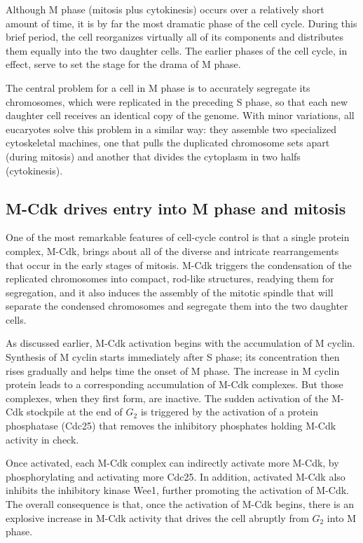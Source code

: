 Although M phase (mitosis plus cytokinesis) occurs over a relatively short
amount of time, it is by far the most dramatic phase of the
cell cycle. During this brief period, the cell reorganizes virtually all of its
components and distributes them equally into the two daughter cells.
The earlier phases of the cell cycle, in effect, serve to set the stage for the
drama of M phase.

The central problem for a cell in M phase is to accurately segregate its
chromosomes, which were replicated in the preceding S phase, so that
each new daughter cell receives an identical copy of the genome. With
minor variations, all eucaryotes solve this problem in a similar way: they
assemble two specialized cytoskeletal machines, one that pulls the duplicated
chromosome sets apart (during mitosis) and another that divides
the cytoplasm in two halfs (cytokinesis).

\subsection{M-Cdk drives entry into M phase and mitosis}

One of the most remarkable features of cell-cycle control is that a single
protein complex, M-Cdk, brings about all of the diverse and intricate
rearrangements that occur in the early stages of mitosis. M-Cdk triggers
the condensation of the replicated chromosomes into compact, rod-like
structures, readying them for segregation, and it also induces the assembly
of the mitotic spindle that will separate the condensed chromosomes
and segregate them into the two daughter cells.

As discussed earlier, M-Cdk activation begins with the accumulation of
M cyclin. Synthesis of M cyclin starts immediately after
S phase; its concentration then rises gradually and helps time the onset
of M phase. The increase in M cyclin protein leads to a corresponding
accumulation of M-Cdk complexes. But those complexes, when they first
form, are inactive. The sudden activation of the M-Cdk stockpile at the
end of $G_2$ is triggered by the activation of a protein phosphatase (Cdc25)
that removes the inhibitory phosphates holding M-Cdk activity in check.

Once activated, each M-Cdk complex can indirectly activate more M-Cdk,
by phosphorylating and activating more Cdc25. In addition, activated
M-Cdk also inhibits the inhibitory kinase Wee1, further promoting the activation of M-Cdk.
The overall consequence is that, once the activation of M-Cdk begins, there is
an explosive increase in M-Cdk activity that drives the cell abruptly from
$G_2$ into M phase.

